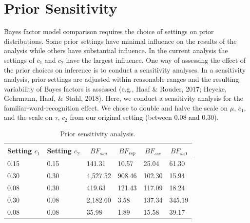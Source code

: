 \documentclass[english,,man]{apa6}
\begin{document}
\hypertarget{prior-sensitivity}{%
\section{Prior Sensitivity}\label{prior-sensitivity}}

Bayes factor model comparison requires the choice of settings on prior distributions. Some prior settings have minimal influence on the results of the analysis while others have substantial influence. In the current analysis the settings of \(c_1\) and \(c_2\) have the largest influence. One way of assessing the effect of the prior choices on inference is to conduct a sensitivity analyses. In a sensitivity analysis, prior settings are adjusted within reasonable ranges and the resulting variability of Bayes factors is assessed (e.g., Haaf \& Rouder, 2017; Heycke, Gehrmann, Haaf, \& Stahl, 2018). Here, we conduct a sensitivity analysis for the familiar-word-recognition effect. We chose to double and halve the scale on \(\mu\), \(c_1\), and the scale on \(\tau\), \(c_2\) from our original setting (between 0.08 and 0.30).

\begin{table}[tbp]

\begin{center}
\begin{threeparttable}

\caption{\label{tab:tabsens}Prior sensitivity analysis.}

\begin{tabular}{llllll}
\toprule
Setting $c_1$ & \multicolumn{1}{c}{Setting $c_2$} & \multicolumn{1}{c}{$BF_{ssu}$} & \multicolumn{1}{c}{$BF_{ssp}$} & \multicolumn{1}{c}{$BF_{ssc}$} & \multicolumn{1}{c}{$BF_{ss0}$}\\
\midrule
0.15 & 0.15 & 141.31 & 10.57 & 25.04 & 61.30\\
0.30 & 0.30 & 4,527.52 & 908.46 & 102.30 & 15.94\\
0.08 & 0.30 & 419.63 & 121.43 & 117.09 & 18.24\\
0.30 & 0.08 & 2,182.60 & 3.58 & 137.34 & 345.19\\
0.08 & 0.08 & 35.98 & 1.89 & 15.58 & 39.17\\
\bottomrule
\end{tabular}

\end{threeparttable}
\end{center}

\end{table}
\end{document}
